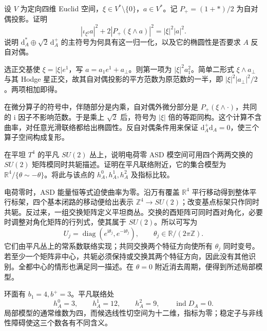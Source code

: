 \begin{exercise}\label{g3:ex:B-asd-symbol-normalization}
 设 \(V\) 为定向四维 Euclid 空间，\(\xi\in V^*\setminus\{0\}\)，\(a\in V^*\)。记 \(P_+=(1+*)/2\) 为自对偶投影。证明
 \[
  |\iota_{\xi^\sharp}a|^2+2|P_+(\xi\wedge a)|^2
    =|\xi|^2|a|^2.
 \]
 说明 \(\mathrm d_A^*\oplus\sqrt2\,\mathrm d_A^+\) 的主符号为何具有这一归一化，以及它的椭圆性是否要求 \(A\) 反自对偶。
\end{exercise}
\begin{solution}
 选正交基使 \(\xi=|\xi|e^1\)，写 \(a=a_1e^1+a_\perp\)。则第一项为 \(|\xi|^2a_1^2\)。简单二形式 \(\xi\wedge a_\perp\) 与其 Hodge 星正交，故其自对偶投影的平方范数为原范数的一半，即 \(|\xi|^2|a_\perp|^2/2\)。两项相加即得。

 在微分算子的符号中，伴随部分是内乘，自对偶外微分部分是 \(P_+(\xi\wedge\cdot)\)，共同的 \(\mathrm i\) 因子不影响范数。于是乘上 \(\sqrt2\) 后，符号为 \(|\xi|\) 倍的等距同构。这个计算不含曲率，对任意光滑联络都给出椭圆性。反自对偶条件用来保证 \(\mathrm d_A^+\mathrm d_A=0\)，使三个算子空间构成复形。
\end{solution}

\begin{exercise}\label{g3:ex:B-torus-flat-moduli}
 在平坦 \(T^4\) 的平凡 \(SU(2)\) 丛上，说明电荷零 ASD 模空间可用四个两两交换的 \(SU(2)\) 矩阵模同时共轭描述。证明在平凡联络附近，它的集合模型为 \(\mathbb R^4/\{\theta\sim-\theta\}\)。将此与该点的 \(h_A^0,h_A^1,h_A^2\) 及指标比较。
\end{exercise}
\begin{solution}
 电荷零时，ASD 能量恒等式迫使曲率为零。沿万有覆盖 \(\mathbb R^4\) 平行移动得到整体平行标架，四个基本闭路的移动便给出表示 \(\mathbb Z^4\to SU(2)\)；改变基点标架只作同时共轭。反过来，一组交换矩阵定义平坦商丛。交换的酉矩阵可同时酉对角化，必要时调整对角化矩阵的行列式，使其属于 \(SU(2)\)。所以可写为
 \[
  U_j=\operatorname{diag}(e^{\mathrm i\theta_j},e^{-\mathrm i\theta_j}),
  \qquad \theta_j\in\mathbb R/(2\pi\mathbb Z).
 \]
 它们由平凡丛上的常系数联络实现；共同交换两个特征方向使所有 \(\theta_j\) 同时变号。若至少一个矩阵非中心，共轭必须保持或交换其两个特征方向，因此没有其他识别。全都中心的情形也满足同一描述。在 \(\theta=0\) 附近消去周期，便得到所述局部模型。

 环面有 \(b_1=4,b^+=3\)。平凡联络处
 \[
  h_A^0=3,\qquad h_A^1=12,\qquad h_A^2=9,
  \qquad\operatorname{ind}D_A=0.
 \]
 局部模型的通常维数为四，而候选线性切空间为十二维，指标为零；稳定子与非线性障碍使这三个数各有不同含义。
\end{solution}


